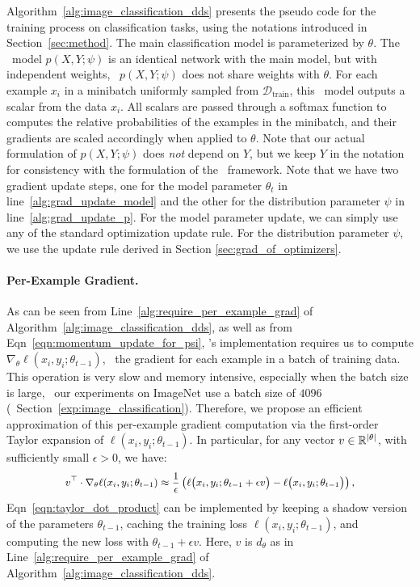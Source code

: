 Algorithm~\ref{alg:image_classification_dds} presents the pseudo code for the training process on classification tasks, using the notations introduced in Section~\ref{sec:method}. 
The main  classification model is parameterized by $\theta$. The \dds~model $p(X, Y; \psi)$ is an identical network with the main model, but with independent weights, \ie~$p(X, Y; \psi)$ does not share weights with $\theta$. For each example $x_i$ in a minibatch uniformly sampled from $\mathcal{D}_\text{train}$, this \dds~model outputs a scalar from the data $x_i$. All scalars are passed through a softmax function to computes the relative probabilities of the examples in the minibatch, and their gradients are scaled accordingly when applied to $\theta$. Note that our actual formulation of $p(X, Y; \psi)$ does \textit{not} depend on $Y$, but we keep $Y$ in the notation for consistency with the formulation of the \dds~framework. Note that we have two gradient update steps, one for the model parameter $\theta_t$ in line~\ref{alg:grad_update_model} and the other for the distribution parameter $\psi$ in line~\ref{alg:grad_update_p}. For the model parameter update, we can simply use any of the standard optimization update rule. For the distribution parameter $\psi$, we use the update rule derived in Section \ref{sec:grad_of_optimizers}.

\paragraph{Per-Example Gradient.} As can be seen from Line~\ref{alg:require_per_example_grad} of Algorithm~\ref{alg:image_classification_dds}, as well as from Eqn~\ref{eqn:momentum_update_for_psi}, \dds's implementation requires us to compute $\nabla_\theta \ell(x_i, y_i; \theta_{t-1})$, \ie~the gradient for each example in a batch of training data. This operation is very slow and memory intensive, especially when the batch size is large, \eg~our experiments on ImageNet use a batch size of $4096$ (\cf~Section~\ref{exp:image_classification}). Therefore, we propose an efficient approximation of this per-example gradient computation via the first-order Taylor expansion of $\ell(x_i, y_i; \theta_{t-1})$. In particular, for any vector $v \in \mathbb{R}^{\left| \theta \right|}$, with sufficiently small $\epsilon > 0$, we have:
    \vspace{-0.3cm}
\begin{equation}
  \label{eqn:taylor_dot_product}
  \small
  \begin{aligned}
    v^\top \cdot \nabla_\theta \ell(x_i, y_i; \theta_{t-1})
    \approx
    \frac{1}{\epsilon}
    \left(
      \ell\big( x_i, y_i; \theta_{t-1} + \epsilon v \big) -
      \ell\big( x_i, y_i; \theta_{t-1} \big)
    \right),
  \end{aligned}
\end{equation}
    \vspace{-0.1cm}
Eqn~\ref{eqn:taylor_dot_product} can be implemented by keeping a shadow version of the parameters $\theta_{t-1}$, caching the training loss $\ell(x_i, y_i; \theta_{t-1})$, and computing the new loss with $\theta_{t-1} + \epsilon v$. Here, $v$ is $d_\theta$ as in Line~\ref{alg:require_per_example_grad} of Algorithm~\ref{alg:image_classification_dds}.